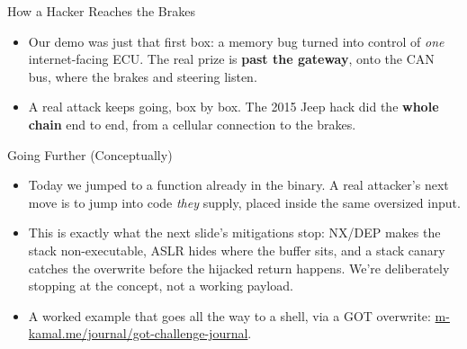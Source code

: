 \begin{frame}{How a Hacker Reaches the Brakes}
  \centering
  \vspace{4mm}
  \begin{itemize}
    \item Our demo was just that first box: a memory bug turned into control of \emph{one} internet-facing ECU. The real prize is \textbf{past the gateway}, onto the CAN bus, where the brakes and steering listen.
    \item A real attack keeps going, box by box. The 2015 Jeep hack did the \textbf{whole chain} end to end, from a cellular connection to the brakes.
  \end{itemize}
\end{frame}

\begin{frame}{Going Further (Conceptually)}
  \footnotesize
  \setlength{\itemsep}{0pt}
  \begin{itemize}
    \item Today we jumped to a function already in the binary. A real attacker's next move is to jump into code \emph{they} supply, placed inside the same oversized input.
    \item This is exactly what the next slide's mitigations stop: NX/DEP makes the stack non-executable, ASLR hides where the buffer sits, and a stack canary catches the overwrite before the hijacked return happens. We're deliberately stopping at the concept, not a working payload.
    \item A worked example that goes all the way to a shell, via a GOT overwrite: \href{https://m-kamal.me/journal/got-challenge-journal/}{m-kamal.me/journal/got-challenge-journal}.
  \end{itemize}
\end{frame}

